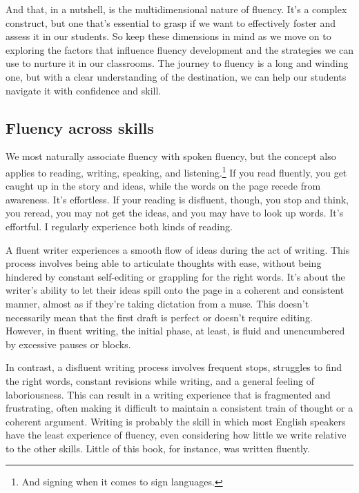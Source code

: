 And that, in a nutshell, is the multidimensional nature of fluency. It's a complex construct, but one that's essential to grasp if we want to effectively foster and assess it in our students. So keep these dimensions in mind as we move on to exploring the factors that influence fluency development and the strategies we can use to nurture it in our classrooms. The journey to fluency is a long and winding one, but with a clear understanding of the destination, we can help our students navigate it with confidence and skill.





\subsection{Fluency across skills}

We most naturally associate fluency with spoken fluency, but the concept also applies to reading, writing, speaking, and listening.\footnote{And signing when it comes to sign languages. } If you read fluently, you get caught up in the story and ideas, while the words on the page recede from awareness. It's effortless. If your reading is disfluent, though, you stop and think, you reread, you may not get the ideas, and you may have to look up words. It's effortful. I regularly experience both kinds of reading.

A fluent writer experiences a smooth flow of ideas during the act of writing. This process involves being able to articulate thoughts with ease, without being hindered by constant self-editing or grappling for the right words. It's about the writer's ability to let their ideas spill onto the page in a coherent and consistent manner, almost as if they're taking dictation from a muse. This doesn't necessarily mean that the first draft is perfect or doesn't require editing. However, in fluent writing, the initial phase, at least, is fluid and unencumbered by excessive pauses or blocks.

In contrast, a disfluent writing process involves frequent stops, struggles to find the right words, constant revisions while writing, and a general feeling of laboriousness. This can result in a writing experience that is fragmented and frustrating, often making it difficult to maintain a consistent train of thought or a coherent argument. Writing is probably the skill in which most English speakers have the least experience of fluency, even considering how little we write relative to the other skills. Little of this book, for instance, was written fluently.

